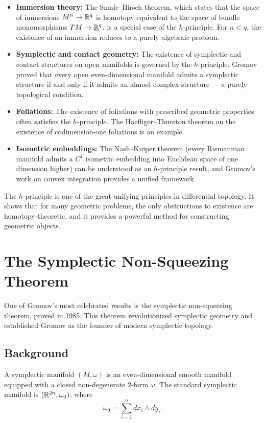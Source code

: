 \begin{itemize}
    \item \textbf{Immersion theory:} The Smale--Hirsch theorem, which states that the space of immersions \(M^n \to \mathbb{R}^q\) is homotopy equivalent to the space of bundle monomorphisms \(TM \to \underline{\mathbb{R}}^q\), is a special case of the \(h\)-principle. For \(n < q\), the existence of an immersion reduces to a purely algebraic problem.
    \item \textbf{Symplectic and contact geometry:} The existence of symplectic and contact structures on open manifolds is governed by the \(h\)-principle. Gromov proved that every open even-dimensional manifold admits a symplectic structure if and only if it admits an almost complex structure --- a purely topological condition.
    \item \textbf{Foliations:} The existence of foliations with prescribed geometric properties often satisfies the \(h\)-principle. The Haefliger--Thurston theorem on the existence of codimension-one foliations is an example.
    \item \textbf{Isometric embeddings:} The Nash--Kuiper theorem (every Riemannian manifold admits a \(C^1\) isometric embedding into Euclidean space of one dimension higher) can be understood as an \(h\)-principle result, and Gromov's work on convex integration provides a unified framework.
\end{itemize}

The \(h\)-principle is one of the great unifying principles in differential topology. It shows that for many geometric problems, the only obstructions to existence are homotopy-theoretic, and it provides a powerful method for constructing geometric objects.

\section{The Symplectic Non-Squeezing Theorem}

One of Gromov's most celebrated results is the symplectic non-squeezing theorem, proved in 1985. This theorem revolutionized symplectic geometry and established Gromov as the founder of modern symplectic topology.

\subsection{Background}

A symplectic manifold \((M, \omega)\) is an even-dimensional smooth manifold equipped with a closed non-degenerate 2-form \(\omega\). The standard symplectic manifold is \((\mathbb{R}^{2n}, \omega_0)\), where
\[
\omega_0 = \sum_{i=1}^n dx_i \wedge dy_i.
\]

